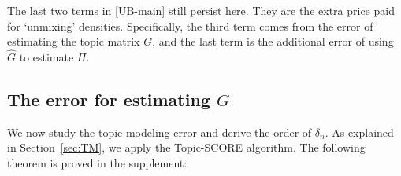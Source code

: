 \documentclass[preprint,11pt]{article}
\numberwithin{equation}{section}
\begin{document}
 
The last two terms in \eqref{UB-main} still persist here. They are the extra price paid for `unmixing'  densities. Specifically, the third term comes from the error of estimating the topic matrix $G$, and the last term is the additional error of using $\widehat{G}$ to estimate $\Pi$. 







\subsection{The error for estimating $G$} \label{subsec:rate-TM}
We now study the topic modeling error and derive the order of $\delta_n$. 
As explained in Section~\ref{sec:TM}, we apply the Topic-SCORE algorithm. The following theorem is proved in the supplement: 

\end{document}
